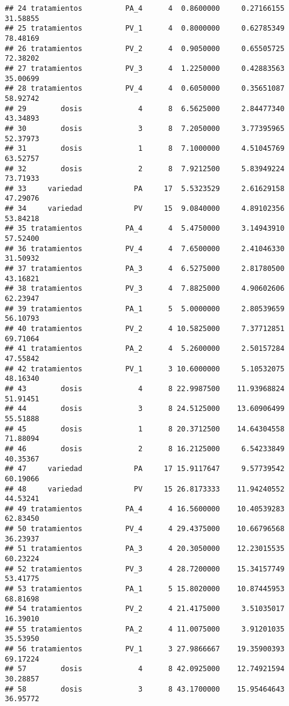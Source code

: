 \documentclass[
]{article}
\begin{document}
\begin{verbatim}
## 24 tratamientos          PA_4      4  0.8600000     0.27166155 31.58855
## 25 tratamientos          PV_1      4  0.8000000     0.62785349 78.48169
## 26 tratamientos          PV_2      4  0.9050000     0.65505725 72.38202
## 27 tratamientos          PV_3      4  1.2250000     0.42883563 35.00699
## 28 tratamientos          PV_4      4  0.6050000     0.35651087 58.92742
## 29        dosis             4      8  6.5625000     2.84477340 43.34893
## 30        dosis             3      8  7.2050000     3.77395965 52.37973
## 31        dosis             1      8  7.1000000     4.51045769 63.52757
## 32        dosis             2      8  7.9212500     5.83949224 73.71933
## 33     variedad            PA     17  5.5323529     2.61629158 47.29076
## 34     variedad            PV     15  9.0840000     4.89102356 53.84218
## 35 tratamientos          PA_4      4  5.4750000     3.14943910 57.52400
## 36 tratamientos          PV_4      4  7.6500000     2.41046330 31.50932
## 37 tratamientos          PA_3      4  6.5275000     2.81780500 43.16821
## 38 tratamientos          PV_3      4  7.8825000     4.90602606 62.23947
## 39 tratamientos          PA_1      5  5.0000000     2.80539659 56.10793
## 40 tratamientos          PV_2      4 10.5825000     7.37712851 69.71064
## 41 tratamientos          PA_2      4  5.2600000     2.50157284 47.55842
## 42 tratamientos          PV_1      3 10.6000000     5.10532075 48.16340
## 43        dosis             4      8 22.9987500    11.93968824 51.91451
## 44        dosis             3      8 24.5125000    13.60906499 55.51888
## 45        dosis             1      8 20.3712500    14.64304558 71.88094
## 46        dosis             2      8 16.2125000     6.54233849 40.35367
## 47     variedad            PA     17 15.9117647     9.57739542 60.19066
## 48     variedad            PV     15 26.8173333    11.94240552 44.53241
## 49 tratamientos          PA_4      4 16.5600000    10.40539283 62.83450
## 50 tratamientos          PV_4      4 29.4375000    10.66796568 36.23937
## 51 tratamientos          PA_3      4 20.3050000    12.23015535 60.23224
## 52 tratamientos          PV_3      4 28.7200000    15.34157749 53.41775
## 53 tratamientos          PA_1      5 15.8020000    10.87445953 68.81698
## 54 tratamientos          PV_2      4 21.4175000     3.51035017 16.39010
## 55 tratamientos          PA_2      4 11.0075000     3.91201035 35.53950
## 56 tratamientos          PV_1      3 27.9866667    19.35900393 69.17224
## 57        dosis             4      8 42.0925000    12.74921594 30.28857
## 58        dosis             3      8 43.1700000    15.95464643 36.95772

\end{verbatim}
\end{document}
